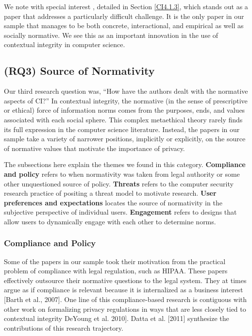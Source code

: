 \documentclass[../thesis.tex]{subfiles}
\begin{document}
We note with special interest \citet{criado2015implicit},
detailed in Section \ref{CI4.1.3},
which stands out as a paper that addresses a particularly difficult
challenge. It is the only paper in our sample that manages to be both
concrete, interactional, and empirical as well as socially normative.
We see this as an important innovation in the use of contextual
integrity in computer science.

\subsection{(RQ3) Source of Normativity}
\label{CI4.3}

Our third research question was, ``How have the authors
dealt with the normative aspects of CI?'' In
contextual integrity, the normative (in the sense of prescriptive or
ethical) force of information norms comes from the purposes, ends, and
values associated with each social sphere. This complex metaethical
theory rarely finds its full expression in the computer science
literature. Instead, the papers in our sample take a variety of
narrower positions, implicitly or explicitly, on the source of
normative values that motivate the importance of privacy.

The subsections here explain the themes we found in this category.
\textbf{Compliance and policy} refers to when normativity was taken
from legal authority or some other unquestioned source of policy.
\textbf{Threats} refers to the computer security research practice of
positing a threat model to motivate research. \textbf{User preferences
and expectations} locates the source of normativity in the subjective
perspective of individual users. \textbf{Engagement} refers to designs
that allow users to dynamically engage with each other to determine
norms.


\subsubsection{Compliance and Policy}
\label{CI4.3.1}

Some of the papers in our sample took their motivation from the
practical problem of compliance with legal regulation, such as HIPAA.
These papers effectively outsource their normative questions to the
legal system. They at times argue as if compliance is relevant because
it is internalized as a business interest [Barth et al., 2007]. One
line of this compliance-based research is contiguous with other work on
formalizing privacy regulations in ways that are less closely tied to
contextual integrity
DeYoung et al.
2010]. Datta et al. [2011] synthesize the contributions of this
research trajectory.
\end{document}

